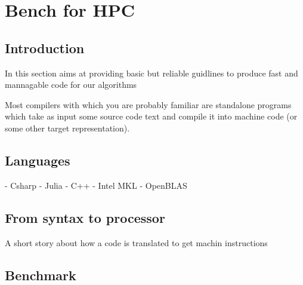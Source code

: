 \chapter{Bench for HPC}

\section{Introduction}

In this section aims at providing basic but reliable guidlines to produce fast and mannagable code
for our algorithms

Most compilers with which you are probably familiar are standalone programs which take as input some source code text and compile it into machine code (or some other target representation).

\cite{Abraham2002}

\section{Languages}
- Csharp
- Julia
- C++
- Intel MKL
- OpenBLAS

\section{From syntax to processor}

A short story about how a code is translated to get machin instructions

\section{Benchmark}


